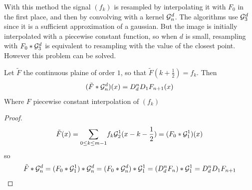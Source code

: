 

With this method the signal $(f_k)$ is resampled by interpolating it with $F_{0}$ in the first place, and then by convolving with a kernel $\mathcal{G}_n^d$. The algorithms use $\mathcal{G}_3^d$ since it is a sufficient approximation of a gaussian.
But the image is initially interpolated with a piecewise constant function, so when $d$ is small, resampling with $F_{0}*\mathcal{G}_3^d$ is equivalent to resampling with the value of the closest point. However this problem can be solved.





\begin{prop}
Let $\tilde{F}$ the continuous plaine of order $1$, so that $\tilde{F}(k+\frac{1}{2})=f_k$. Then
\begin{equation*}
( \tilde{F} * \mathcal{G}_n^d ) (x) = D_d^{n}D_1 F_{n+1}(x)
\end{equation*}
Where $F$ piecewise constant interpolation of $(f_k)$ 
\end{prop}

\begin{proof}

\begin{equation*}
\tilde{F}(x)=\displaystyle{\sum_{0\le k \le m-1}} f_k \mathcal{G}_2^1 (x-k-\frac{1}{2})=(F_{0} *\mathcal{G}_1^1 )(x)
\end{equation*}
so
\begin{equation*}
\tilde{F}*\mathcal{G}_n^d=(F_{0}*\mathcal{G}_1^1)*\mathcal{G}_n^d=(F_{0}*\mathcal{G}_n^d)*\mathcal{G}_1^1=(D_d^n F_{n})*\mathcal{G}_1^1= D_d^n D_1 F_{n+1}
\end{equation*}
\end{proof}


